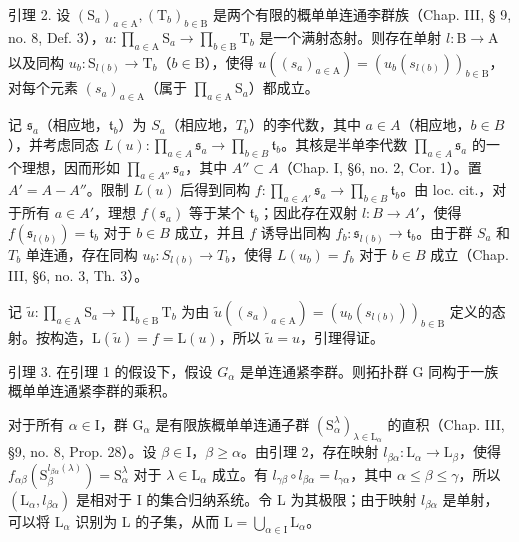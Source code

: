 引理 2. 设 \((\mathrm{S}_a)_{a\in \mathrm{A}},(\mathrm{T}_b)_{b\in \mathrm{B}}\) 是两个有限的概单单连通李群族（Chap. III, § 9, no. 8, Def. 3），\(u:\prod_{a\in \mathrm{A}}\mathrm{S}_a\to \prod_{b\in \mathrm{B}}\mathrm{T}_b\) 是一个满射态射。则存在单射 \(l: \mathrm{B} \to \mathrm{A}\) 以及同构 \(u_b: \mathrm{S}_{l(b)} \to \mathrm{T}_b\)（\(b \in \mathrm{B}\)），使得 \(u((s_a)_{a \in \mathrm{A}}) = (u_b(s_{l(b)}))_{b \in \mathrm{B}}\)，对每个元素 \((s_a)_{a \in \mathrm{A}}\)（属于 \(\prod_{a \in \mathrm{A}} \mathrm{S}_a\)）都成立。

记 \(\mathfrak{s}_a\)（相应地，\(\mathfrak{t}_b\)）为 \(S_a\)（相应地，\(T_b\)）的李代数，其中 \(a \in A\)（相应地，\(b \in B\)），并考虑同态 \(L(u): \prod_{a \in A} \mathfrak{s}_a \to \prod_{b \in B} \mathfrak{t}_b\)。其核是半单李代数 \(\prod_{a \in A} \mathfrak{s}_a\) 的一个理想，因而形如 \(\prod_{a \in A''} \mathfrak{s}_a\)，其中 \(A'' \subset A\)（Chap. I, §6, no. 2, Cor. 1）。置 \(A' = A - A''\)。限制 \(L(u)\) 后得到同构 \(f: \prod_{a \in A'} \mathfrak{s}_a \to \prod_{b \in B} \mathfrak{t}_b\)。由 loc. cit.，对于所有 \(a \in A'\)，理想 \(f(\mathfrak{s}_a)\) 等于某个 \(\mathfrak{t}_b\)；因此存在双射 \(l: B \to A'\)，使得 \(f(\mathfrak{s}_{l(b)}) = \mathfrak{t}_b\) 对于 \(b \in B\) 成立，并且 \(f\) 诱导出同构 \(f_b: \mathfrak{s}_{l(b)} \to \mathfrak{t}_b\)。由于群 \(S_a\) 和 \(T_b\) 单连通，存在同构 \(u_b: S_{l(b)} \to T_b\)，使得 \(L(u_b) = f_b\) 对于 \(b \in B\) 成立（Chap. III, §6, no. 3, Th. 3）。

记 \(\tilde{u}:\prod_{a\in \mathrm{A}}\mathrm{S}_a\to \prod_{b\in \mathrm{B}}\mathrm{T}_b\) 为由 \(\tilde{u} ((s_a)_{a\in \mathrm{A}}) = (u_b(s_{l(b)}))_{b\in \mathrm{B}}\) 定义的态射。按构造，\(\mathrm{L}(\tilde{u}) = f = \mathrm{L}(u)\)，所以 \(\tilde{u} = u\)，引理得证。

引理 3. 在引理 1 的假设下，假设 \(G_{\alpha}\) 是单连通紧李群。则拓扑群 G 同构于一族概单单连通紧李群的乘积。

对于所有 \(\alpha \in \mathrm{I}\)，群 \(\mathrm{G}_{\alpha}\) 是有限族概单单连通子群 \((\mathrm{S}_{\alpha}^{\lambda})_{\lambda \in \mathrm{L}_{\alpha}}\) 的直积（Chap. III, §9, no. 8, Prop. 28）。设 \(\beta \in \mathrm{I}\)，\(\beta \geq \alpha\)。由引理 2，存在映射 \(l_{\beta \alpha}: \mathrm{L}_{\alpha} \to \mathrm{L}_{\beta}\)，使得 \(f_{\alpha \beta}(\mathrm{S}_{\beta}^{l_{\beta \alpha}(\lambda)}) = \mathrm{S}_{\alpha}^{\lambda}\) 对于 \(\lambda \in \mathrm{L}_{\alpha}\) 成立。有 \(l_{\gamma \beta} \circ l_{\beta \alpha} = l_{\gamma \alpha}\)，其中 \(\alpha \leq \beta \leq \gamma\)，所以 \((\mathrm{L}_{\alpha}, l_{\beta \alpha})\) 是相对于 I 的集合归纳系统。令 L 为其极限；由于映射 \(l_{\beta \alpha}\) 是单射，可以将 \(\mathrm{L}_{\alpha}\) 识别为 L 的子集，从而 \(\mathrm{L} = \bigcup_{\alpha \in \mathrm{I}} \mathrm{L}_{\alpha}\)。

